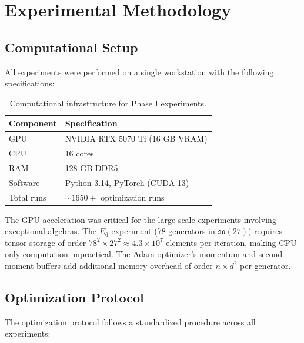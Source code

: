 \section{Experimental Methodology}\label{sec:methodology}

\subsection{Computational Setup}\label{sec:computational_setup}

All experiments were performed on a single workstation with the following specifications:

\begin{table}[t]
\centering
\begin{tabular}{ll}
\hline\hline
\textbf{Component} & \textbf{Specification} \\
\hline
GPU & NVIDIA RTX 5070 Ti (16 GB VRAM) \\
CPU & 16 cores \\
RAM & 128 GB DDR5 \\
Software & Python 3.14, PyTorch (CUDA 13) \\
Total runs & $\sim 1650+$ optimization runs \\
\hline\hline
\end{tabular}
\caption{Computational infrastructure for Phase I experiments.}
\label{tab:computational_setup}
\end{table}

The GPU acceleration was critical for the large-scale experiments involving exceptional algebras. The $E_6$ experiment (78 generators in $\mathfrak{so}(27)$) requires tensor storage of order $78^2 \times 27^2 \approx 4.3 \times 10^7$ elements per iteration, making CPU-only computation impractical. The Adam optimizer's momentum and second-moment buffers add additional memory overhead of order $n \times d^2$ per generator.

\subsection{Optimization Protocol}\label{sec:optimization_protocol}

The optimization protocol follows a standardized procedure across all experiments:


